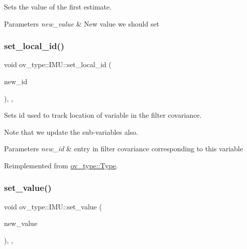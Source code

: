 Sets the value of the first estimate. 


\begin{DoxyParams}{Parameters}
{\em new\+\_\+value} & New value we should set \\
\hline
\end{DoxyParams}
\mbox{\label{classov__type_1_1IMU_a9d4e915d474e8e13591a11a54ac7c969}} 
\subsubsection{\texorpdfstring{set\+\_\+local\+\_\+id()}{set\_local\_id()}}
{\footnotesize\ttfamily void ov\+\_\+type\+::\+I\+M\+U\+::set\+\_\+local\+\_\+id (\begin{DoxyParamCaption}\item[{int}]{new\+\_\+id }\end{DoxyParamCaption})\hspace{0.3cm}{\ttfamily [inline]}, {\ttfamily [override]}, {\ttfamily [virtual]}}



Sets id used to track location of variable in the filter covariance. 

Note that we update the sub-\/variables also.


\begin{DoxyParams}{Parameters}
{\em new\+\_\+id} & entry in filter covariance corresponding to this variable \\
\hline
\end{DoxyParams}


Reimplemented from \hyperlink{classov__type_1_1Type_a52cb2fe6e25dbe8875da3fd618cf0b61}{ov\+\_\+type\+::\+Type}.

\mbox{\label{classov__type_1_1IMU_a53586b4f92ba0110c2b2241fa26862a1}} 
\subsubsection{\texorpdfstring{set\+\_\+value()}{set\_value()}}
{\footnotesize\ttfamily void ov\+\_\+type\+::\+I\+M\+U\+::set\+\_\+value (\begin{DoxyParamCaption}\item[{const Eigen\+::\+Matrix\+Xd \&}]{new\+\_\+value }\end{DoxyParamCaption})\hspace{0.3cm}{\ttfamily [inline]}, {\ttfamily [override]}, {\ttfamily [virtual]}}



